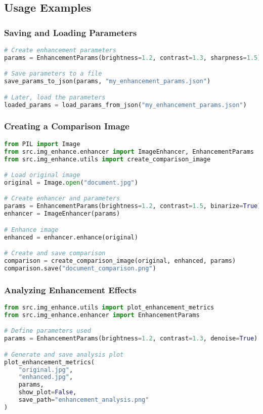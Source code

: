 \subsection{Usage Examples}

\subsubsection{Saving and Loading Parameters}
\begin{lstlisting}[language=Python]
# Create enhancement parameters
params = EnhancementParams(brightness=1.2, contrast=1.3, sharpness=1.5)

# Save parameters to a file
save_params_to_json(params, "my_enhancement_params.json")

# Later, load the parameters
loaded_params = load_params_from_json("my_enhancement_params.json")
\end{lstlisting}

\subsubsection{Creating a Comparison Image}
\begin{lstlisting}[language=Python]
from PIL import Image
from src.img_enhance.enhancer import ImageEnhancer, EnhancementParams
from src.img_enhance.utils import create_comparison_image

# Load original image
original = Image.open("document.jpg")

# Create enhancer and parameters
params = EnhancementParams(brightness=1.2, contrast=1.5, binarize=True)
enhancer = ImageEnhancer(params)

# Enhance image
enhanced = enhancer.enhance(original)

# Create and save comparison
comparison = create_comparison_image(original, enhanced, params)
comparison.save("document_comparison.png")
\end{lstlisting}

\subsubsection{Analyzing Enhancement Effects}
\begin{lstlisting}[language=Python]
from src.img_enhance.utils import plot_enhancement_metrics
from src.img_enhance.enhancer import EnhancementParams

# Define parameters used
params = EnhancementParams(brightness=1.2, contrast=1.3, denoise=True)

# Generate and save analysis plot
plot_enhancement_metrics(
    "original.jpg",
    "enhanced.jpg",
    params,
    show_plot=False,
    save_path="enhancement_analysis.png"
)
\end{lstlisting} 